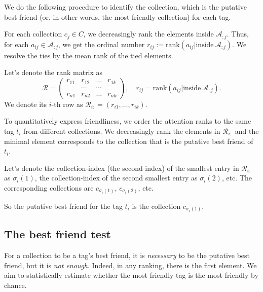 \documentclass{llncs}
\begin{document}

We do the following procedure to identify the collection, which is the putative best friend (or, in other words, the most friendly collection) for each tag.

For each collection $c_j \in C$, we decreasingly rank the elements inside $\mathcal{A}_{:j}$. Thus, for each $a_{ij} \in \mathcal{A}_{:j}$, we get the ordinal number $r_{ij}:=\text{rank}\left(a_{ij}|\text{inside}~\mathcal{A}_{:j}\right)$. We resolve the ties by the mean rank of the tied elements. 

Let's denote the rank matrix as 
\begin{equation}
\label{def:R}
\mathcal{R} = \begin{pmatrix}
r_{11} & r_{12} & \dots & r_{1k} \\
       &\cdots & \cdots &  \\
r_{n1} & r_{n2} & \dots & r_{nk}
\end{pmatrix}, 
\quad
r_{ij} =\text{rank}\left(a_{ij}|\text{inside}~\mathcal{A}_{:j}\right).
\end{equation}
We denote its $i$-th row as $\mathcal{R}_{i:} = (r_{i1}, \dots, r_{ik})$.

To quantitatively express friendliness, we order the attention ranks to the same tag $t_i$ from different collections. We decreasingly rank the elements in $\mathcal{R}_{i:}$ and the minimal element
corresponds to the collection that is the putative best friend of $t_i$.

Let's denote the collection-index (the second index) of the smallest entry in $\mathcal{R}_{i:}$ as $\sigma_i(1)$, the collection-index of the second smallest entry as ${\sigma_i(2)}$, etc. The corresponding collections are $c_{\sigma_{i}(1)}$, $c_{\sigma_{i}(2)}$, etc. 

So the putative best friend for the tag $t_i$ is the collection $c_{\sigma_{i}(1)}$.

\subsection{The best friend test}
\label{sec:best_friend_test}

For a collection to be a tag's best friend, it is \textit{necessary} to be the putative best friend, but it is \textit{not enough}. Indeed, in any ranking, there is the first element. We aim to statistically estimate whether the most friendly tag is the most friendly by chance. 
\end{document}
